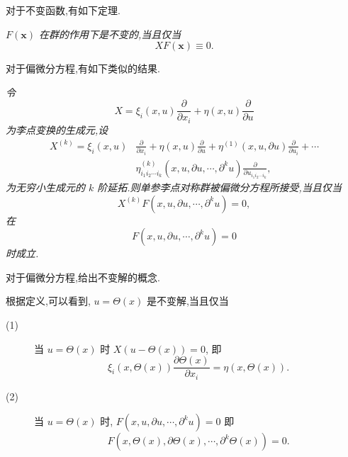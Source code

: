 对于不变函数,有如下定理.
\begin{theorem}
	\emph{$F(\mathbf{x})$ 在群的作用下是不变的,当且仅当
	\begin{equation*}
		XF(\mathbf{x})\equiv 0.
	\end{equation*}}
\end{theorem}

对于偏微分方程,有如下类似的结果.
\begin{theorem}
	\emph{令
	\begin{equation*}
		X=\xi_i(x,u)\frac{\partial}{\partial x_i}+\eta(x,u)\frac{\partial}{\partial u}
	\end{equation*}
	为李点变换的生成元,设
	\begin{equation*}
\begin{aligned}
X^{(k)}=\xi_i(x,u)&\frac{\partial}{\partial x_i}+\eta(x,u)\frac{\partial}{\partial u}+\eta^{(1)}(x,u,\partial u)\frac{\partial}{\partial u_i}+\cdots \\
&\eta^{(k)}_{i_1i_2\cdots i_k}(x,u,\partial u,\cdots,\partial ^k u)\frac{\partial}{\partial u_{i_1i_2\cdots i_k}},
\end{aligned}
\end{equation*}
为无穷小生成元的 $k$ 阶延拓.则单参李点对称群被偏微分方程所接受,当且仅当
\begin{equation*}
	X^{(k)}F(x,u,\partial u,\cdots,\partial ^k u)=0,
\end{equation*}
在
\begin{equation*}
	F(x,u,\partial u,\cdots,\partial ^k u)=0
\end{equation*}
时成立.}
\end{theorem}

对于偏微分方程,给出不变解的概念.

根据定义,可以看到, $u=\Theta(x)$ 是不变解,当且仅当
\begin{description}
	\item[(1)] 当 $u=\Theta(x)$ 时 $X(u-\Theta(x))=0$, 即
	\begin{equation*}
		\xi_i(x,\Theta(x))\frac{\partial \Theta(x)}{\partial x_i}=\eta(x,\Theta(x)).
	\end{equation*}
	\item[(2)] 当 $u=\Theta(x)$ 时, $F(x,u,\partial u,\cdots,\partial ^k u)=0$ 即
	\begin{equation*}
		F(x,\Theta(x),\partial \Theta(x),\cdots,\partial ^k \Theta(x))=0.
	\end{equation*}
\end{description}

